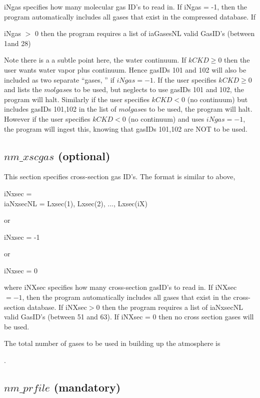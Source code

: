 \documentclass[12pt]{article}
\newcommand{\ttab}{\indent\indent}
\begin{document}
\medskip\noindent 
{\sf iNgas} specifies how many molecular gas ID's to read in.  If {\sf
iNgas = -1}, then the program automatically includes all gases that exist
in the compressed database.  If {\sf iNgas $>$ 0 then the program
requires a list of {\sf iaGasesNL} valid GasID's (between 1and 28)

Note there is a a subtle point here, the water continuum. If $kCKD \ge 0$ then 
the user wants water vapor plus continuum. Hence gasIDs 101 and 102 will also
be included as two separate ``gases, '' if $iNgas = -1$. If the user
specifies $kCKD \ge 0$ and lists the $molgas$es to be used, but neglects to
use gasIDs 101 and 102, the program will halt. Similarly if the user
specifies $kCKD < 0$ (no continuum) but includes gasIDs 101,102 in the list
of $molgas$es to be used, the program will halt. However if the user
specifies $kCKD <  0$ (no continuum) and uses $iNgas = -1$, the program will
ingest this, knowing that gasIDs 101,102 are NOT to be used.

\subsection{$nm\_xscgas$ (optional)}

This section specifies cross-section gas ID's.  The format is similar to 
above,

\smallskip
{\sf 
\ttab iNxsec = \\
\ttab iaNxsecNL = Lxsec(1),  Lxsec(2),  ..., Lxsec(iX)
}

\smallskip
\noindent or 

\smallskip
{\sf 
\ttab iNxsec = -1
}

\smallskip
\noindent or 

\smallskip
{\sf 
\ttab iNxsec = 0
}

\medskip\noindent 
where {\sf iNXsec} specifies how many cross-section gasID's to read in.
If {\sf iNXsec} $ = -1$, then the program automatically includes all gases
that exist in the cross-section database.  If {\sf iNXsec}$> 0$ then the
program requires a list of {\sf iaNxsecNL} valid GasID's (between 51 and
63).  If {\sf iNXsec} = 0 then no cross section gases will be used.

The total number of gases to be used in building up the atmosphere is

\medskip
\ttab {\sf iN = iNumGases = iNgas + iNxsec}. 

\subsection{$nm\_prfile$ (mandatory)}

}
\end{document}
